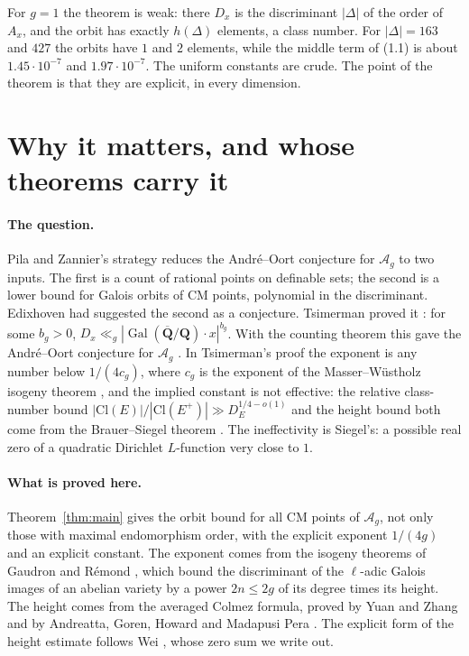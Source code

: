 \documentclass[11pt,a4paper]{article}
\theoremstyle{plain}
\theoremstyle{remark}
\newcommand{\Q}{\mathbf Q}
\newcommand{\Ag}{\mathcal A_g}
\newcommand{\Gal}{\operatorname{Gal}}
\newcommand{\Qb}{\overline{\mathbf Q}}
\begin{document}
For $g=1$ the theorem is weak: there $D_x$ is the discriminant $|\Delta|$ of the order of $A_x$, and the orbit has
exactly $h(\Delta)$ elements, a class number. For $|\Delta|=163$ and $427$ the orbits have $1$ and $2$ elements,
while the middle term of (1.1) is about $1.45\cdot10^{-7}$ and $1.97\cdot10^{-7}$. The uniform constants are crude.
The point of the theorem is that they are explicit, in every dimension.

\section{Why it matters, and whose theorems carry it}

\paragraph{The question.}
Pila and Zannier's strategy reduces the Andr\'e--Oort conjecture for $\Ag$ to two inputs. The first is a count of
rational points on definable sets; the second is a lower bound for Galois orbits of CM points, polynomial in the
discriminant. Edixhoven had suggested the second as a conjecture. Tsimerman proved it \cite[Theorem~5.1]{Ts18}: for
some $b_g>0$, $D_x\ll_g|\Gal(\Qb/\Q)\cdot x|^{b_g}$. With the counting theorem this gave the Andr\'e--Oort conjecture
for $\Ag$ \cite[Theorem~5.2]{Ts18}. In Tsimerman's proof the exponent is any number below $1/(4c_g)$, where $c_g$ is the
exponent of the Masser--W\"ustholz isogeny theorem \cite[proof of Theorem~4.1]{Ts18}, and the implied constant is not
effective: the relative class-number bound $|\mathrm{Cl}(E)|/|\mathrm{Cl}(E^+)|\gg D_E^{1/4-o(1)}$ and the height bound
both come from the Brauer--Siegel theorem \cite[\S\S1.1, 3]{Ts18}. The ineffectivity is Siegel's: a possible real
zero of a quadratic Dirichlet $L$-function very close to $1$.

\paragraph{What is proved here.}
Theorem~\ref{thm:main} gives the orbit bound for all CM points of $\Ag$, not only those with maximal endomorphism
order, with the explicit exponent $1/(4g)$ and an explicit constant. The exponent comes from the isogeny theorems of
Gaudron and R\'emond \cite{GR23}, which bound the discriminant of the $\ell$-adic Galois images of an abelian variety
by a power $2n\leq 2g$ of its degree times its height. The height comes from the averaged Colmez formula, proved by
Yuan and Zhang \cite{YZ} and by Andreatta, Goren, Howard and Madapusi Pera \cite{AGHMP}. The explicit form of the
height estimate follows Wei \cite[Proposition~5.3]{Wei}, whose zero sum we write out.
\end{document}
